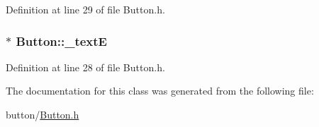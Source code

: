 Definition at line 29 of file Button.\-h.

\hypertarget{class_button_a55dcdefb9e223357f1bb1c66c968465c}{
\subsubsection[{\-\_\-text\-E}]{$\ast$ Button\-::\-\_\-text\-E\hspace{0.3cm}{\ttfamily [protected]}}}\label{class_button_a55dcdefb9e223357f1bb1c66c968465c}


Definition at line 28 of file Button.\-h.



The documentation for this class was generated from the following file\-:\begin{DoxyCompactItemize}
\item 
button/\hyperlink{_button_8h}{Button.\-h}\end{DoxyCompactItemize}

